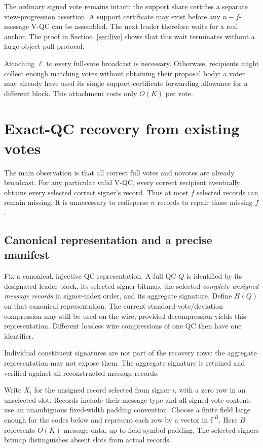 \documentclass[11pt,a4paper]{article}
\theoremstyle{definition}
\newcommand{\FF}{\mathbb{F}}
\begin{document}
The ordinary signed vote remains intact: the support share certifies a
separate view-progression assertion. A support certificate may exist before
any \(n-f\)-message V-QC can be assembled. The next leader therefore waits
for a real anchor. The proof in Section~\ref{sec:live} shows that this wait
terminates without a large-object pull protocol.

Attaching \(\ell\) to every full-vote broadcast is necessary. Otherwise,
recipients might collect enough matching votes without obtaining their
proposal body: a voter may already have used its single support-certificate
forwarding allowance for a different block. This attachment costs only
\(O(K)\) per vote.

\section{Exact-QC recovery from existing votes}
\label{sec:recovery}

The main observation is that all correct full votes and novotes are already
broadcast. For any particular valid V-QC, every correct recipient eventually
obtains every selected correct signer's record. Thus at most \(f\) selected
records can remain missing. It is unnecessary to redisperse \(n\) records
to repair those missing \(f\).

\subsection{Canonical representation and a precise manifest}

Fix a canonical, injective QC representation. A full QC \(Q\) is identified
by its designated leader block, its selected signer bitmap, the selected
\emph{complete unsigned message records} in signer-index order, and its
aggregate signature. Define \(H(Q)\) on that canonical representation.
The current standard-vote/deviation compression may still be used on the
wire, provided decompression yields this representation. Different lossless
wire compressions of one QC then have one identifier.

Individual constituent signatures are not part of the recovery rows: the
aggregate representation may not expose them. The aggregate signature is
retained and verified against all reconstructed message records.

Write \(X_i\) for the unsigned record selected from signer \(i\), with a
zero row in an unselected slot. Records include their message type and all
signed vote content; use an unambiguous fixed-width padding convention.
Choose a finite field large enough for the codes below and represent each
row by a vector in \(\FF^B\). Here \(B\) represents \(O(K)\) message data,
up to field-symbol padding. The selected-signers bitmap distinguishes absent
slots from actual records.
\end{document}

